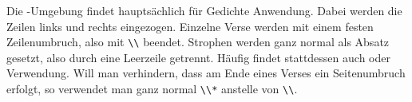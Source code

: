   Die -Umgebung findet hauptsächlich für
  Gedichte Anwendung. Dabei werden die Zeilen links und rechts
  eingezogen. Einzelne Verse werden mit einem festen Zeilenumbruch, also mit
  \verb|\\|\IndexCmd{\textbackslash} beendet. Strophen werden ganz normal als
  Absatz gesetzt, also durch eine Leerzeile getrennt.  Häufig findet
  stattdessen auch  oder
   Verwendung. Will man verhindern, dass am
  Ende eines Verses ein Seitenumbruch erfolgt, so
  verwendet man ganz normal \verb|\\*|\IndexCmd{\textbackslash*} anstelle von
  \verb|\\|.%
